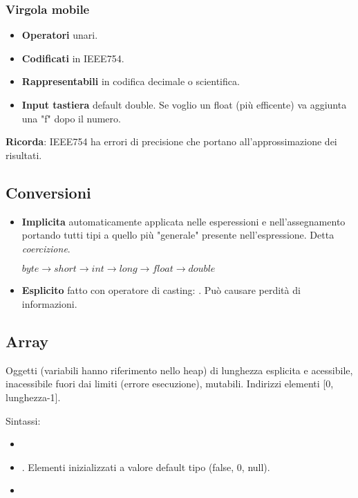 \subsubsection{Virgola mobile}
\begin{itemize}
	\item \textbf{Operatori}  unari.
	\item \textbf{Codificati} in IEEE754.
	\item \textbf{Rappresentabili} in codifica decimale o scientifica.
	\item \textbf{Input tastiera} default double. Se voglio un float (più efficente) va aggiunta una "f" dopo il numero.
\end{itemize}
\textbf{Ricorda}: IEEE754 ha errori di precisione che portano all'approssimazione dei risultati.

\subsection{Conversioni}
\begin{itemize}
	\item \textbf{Implicita} automaticamente applicata nelle esperessioni e nell'assegnamento portando tutti tipi a quello più "generale" presente nell'espressione. Detta \textit{coercizione}.

	$byte\to short \to int \to long \to float \to double$
	\item \textbf{Esplicito} fatto con operatore di casting: . Può causare perdità di informazioni.
\end{itemize}

\subsection{Array}
Oggetti (variabili hanno riferimento nello heap) di lunghezza esplicita e acessibile, inacessibile fuori dai limiti (errore esecuzione), mutabili. Indirizzi elementi [0, lunghezza-1].

Sintassi:
\begin{itemize}
	\item {}
	\item {}. Elementi inizializzati a valore default tipo (false, 0, null).
	\item {}
\end{itemize}

